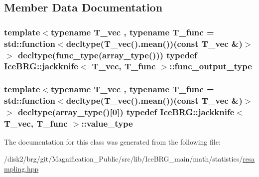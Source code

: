 \subsection{Member Data Documentation}
\hypertarget{classIceBRG_1_1jackknife_a1b24a65a9543f5708c9fc895620c031b}{}
\subsubsection[{func\+\_\+output\+\_\+type}]{\setlength{\rightskip}{0pt plus 5cm}template$<$typename T\+\_\+vec , typename T\+\_\+func  = std\+::function$<$decltype(\+T\+\_\+vec().\+mean())(const T\+\_\+vec \&)$>$$>$ decltype({\bf func\+\_\+type}({\bf array\+\_\+type}())) typedef {\bf Ice\+B\+R\+G\+::jackknife}$<$ T\+\_\+vec, T\+\_\+func $>$\+::func\+\_\+output\+\_\+type}\label{classIceBRG_1_1jackknife_a1b24a65a9543f5708c9fc895620c031b}
\hypertarget{classIceBRG_1_1jackknife_a31ed80992ab0c76c0b84122eb4186c92}{}
\subsubsection[{value\+\_\+type}]{\setlength{\rightskip}{0pt plus 5cm}template$<$typename T\+\_\+vec , typename T\+\_\+func  = std\+::function$<$decltype(\+T\+\_\+vec().\+mean())(const T\+\_\+vec \&)$>$$>$ decltype({\bf array\+\_\+type}()\mbox{[}0\mbox{]}) typedef {\bf Ice\+B\+R\+G\+::jackknife}$<$ T\+\_\+vec, T\+\_\+func $>$\+::value\+\_\+type}\label{classIceBRG_1_1jackknife_a31ed80992ab0c76c0b84122eb4186c92}


The documentation for this class was generated from the following file\+:\begin{DoxyCompactItemize}
\item 
/disk2/brg/git/\+Magnification\+\_\+\+Public/src/lib/\+Ice\+B\+R\+G\+\_\+main/math/statistics/\hyperlink{resampling_8hpp}{resampling.\+hpp}\end{DoxyCompactItemize}
